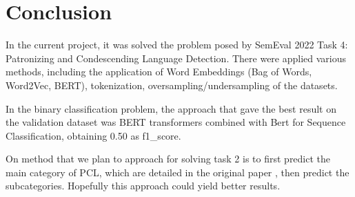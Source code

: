 \documentclass[11pt]{article}
\begin{document}
\section{Conclusion}

In the current project, it was solved the problem posed by SemEval 2022 Task
4: Patronizing and Condescending Language Detection. There were applied
various methods, including the application of Word Embeddings (Bag of Words,
Word2Vec, BERT), tokenization, oversampling/undersampling of the datasets.

In the binary classification problem, the approach that gave the best result
on the validation dataset was BERT transformers combined with Bert for
Sequence Classification, obtaining 0.50 as f1\_score.

On method that we plan to approach for solving task 2 is to first predict the
main category of PCL, which are detailed in the original paper \cite{perezalmendros2020dont}, then predict the subcategories. Hopefully this approach could yield better results.




\end{document}
